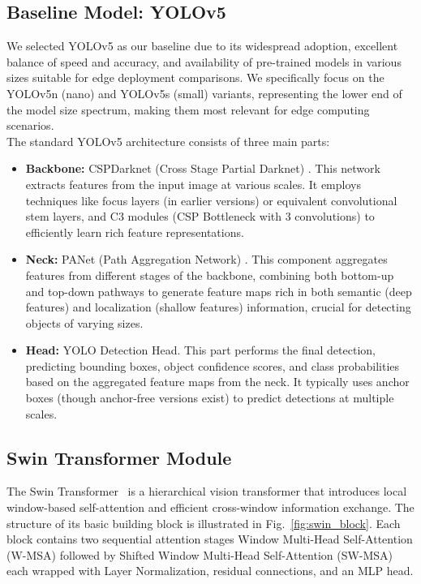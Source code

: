 \documentclass[conference]{IEEEtran}
\begin{document}
\subsection{Baseline Model: YOLOv5}
We selected YOLOv5 \cite{yolov5} as our baseline due to its widespread adoption, excellent balance of speed and accuracy, and availability of pre-trained models in various sizes suitable for edge deployment comparisons. We specifically focus on the YOLOv5n (nano) and YOLOv5s (small) variants, representing the lower end of the model size spectrum, making them most relevant for edge computing scenarios.
\\
The standard YOLOv5 architecture consists of three main parts:
\begin{itemize}
    \item \textbf{Backbone:} CSPDarknet (Cross Stage Partial Darknet) \cite{wang2019cspnet}. This network extracts features from the input image at various scales. It employs techniques like focus layers (in earlier versions) or equivalent convolutional stem layers, and C3 modules (CSP Bottleneck with 3 convolutions) to efficiently learn rich feature representations.
    \item \textbf{Neck:} PANet (Path Aggregation Network) \cite{liu2018path}. This component aggregates features from different stages of the backbone, combining both bottom-up and top-down pathways to generate feature maps rich in both semantic (deep features) and localization (shallow features) information, crucial for detecting objects of varying sizes.
    \item \textbf{Head:} YOLO Detection Head. This part performs the final detection, predicting bounding boxes, object confidence scores, and class probabilities based on the aggregated feature maps from the neck. It typically uses anchor boxes (though anchor-free versions exist) to predict detections at multiple scales.
\end{itemize}

\subsection{Swin Transformer Module}\label{AA}

The Swin Transformer~\cite{liu2021swin} is a hierarchical vision transformer that introduces local window-based self-attention and efficient cross-window information exchange. The structure of its basic building block is illustrated in Fig.~\ref{fig:swin_block}. Each block contains two sequential attention stages Window Multi-Head Self-Attention (W-MSA) followed by Shifted Window Multi-Head Self-Attention (SW-MSA) each wrapped with Layer Normalization, residual connections, and an MLP head.
\end{document}
